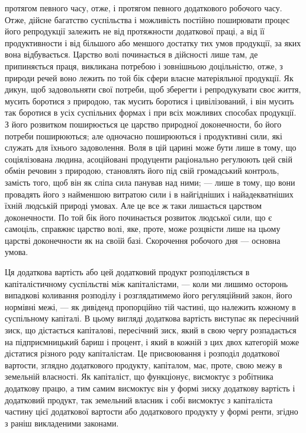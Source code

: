 протягом певного часу, отже, і протягом певного додаткового робочого часу. Отже,
дійсне багатство суспільства і можливість постійно поширювати процес його
репродукції залежить не від протяжности додаткової праці, а від її продуктивности
і від більшого або меншого достатку тих умов продукції, за яких вона відбувається.
Царство волі починається в дійсності лише там, де припиняється праця,
викликана потребою і зовнішньою доцільністю, отже, з природи речей воно
лежить по той бік сфери власне матеріяльної продукції. Як дикун, щоб задовольняти
свої потреби, щоб зберегти і репродукувати своє життя, мусить боротися
з природою, так мусить боротися і цивілізований, і він мусить так боротися
в усіх суспільних формах і при всіх можливих способах продукції. З його
розвитком поширюється це царство природної доконечности, бо його потреби
поширюються; але одночасно поширюються і продуктивні сили, які служать
для їхнього задоволення. Воля в цій царині може бути лише в тому, що соціялізована
людина, асоційовані продуценти раціонально регулюють цей свій обмін
речовин з природою, становлять його під свій громадський контроль, замість того,
щоб він як сліпа сила панував над ними; — лише в тому, що вони провадять його
з найменшою витратою сили і в найгідніших і найадекватніших їхній людській
природі умовах. Але це все ж таки лишається царством доконечности. По той
бік його починається розвиток людської сили, що є самоціль, справжнє царство
волі, яке, проте, може розцвісти лише на цьому царстві доконечности як на
своїй базі. Скорочення робочого дня — основна умова.

Ця додаткова вартість або цей додатковий продукт розподіляється в капіталістичному
суспільстві між капіталістами, — коли ми лишимо осторонь випадкові
коливання розподілу і розглядатимемо його регуляційний закон, його нормівні
межі, — як дивіденд пропорційно тій частині, що належить кожному в суспільному
капіталі. В цьому вигляді додаткова вартість виступає як пересічний
зиск, що дістається капіталові, пересічний зиск, який в свою чергу розпадається
на підприємницький бариш і процент, і який в кожній з цих двох категорій
може дістатися різного роду капіталістам. Це присвоювання і розподіл додаткової
вартости, зглядно додаткового продукту, капіталом, має, проте, свою межу в земельній
власності. Як капіталіст, що функціонує, висмоктує з робітника додаткову
працю, а тим самим висмоктує він у формі зиску додаткову вартість
і додатковий продукт, так земельний власник і собі висмоктує з капіталіста
частину цієї додаткової вартости або додаткового продукту у формі ренти, згідно
з раніш викладеними законами.

